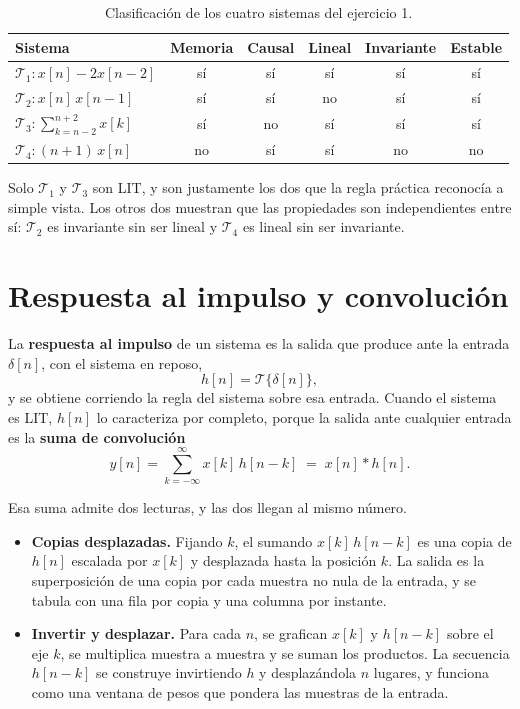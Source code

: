 \documentclass[10pt,a4paper]{article}
\newcommand{\tema}[1]{%
  \bigskip
  \section*{#1}
  \vspace{-0.6em}
}
\begin{document}
	\begin{table}[H]
		\centering
		\caption{Clasificación de los cuatro sistemas del ejercicio 1.}
		\label{tab:sol_ej1}
		\begin{tabular}{lccccc}
			\toprule
			Sistema & Memoria & Causal & Lineal & Invariante & Estable \\
			\midrule
			$\mathcal{T}_1: x[n]-2x[n-2]$          & sí & sí & sí & sí & sí \\
			$\mathcal{T}_2: x[n]\,x[n-1]$          & sí & sí & no & sí & sí \\
			$\mathcal{T}_3: \sum_{k=n-2}^{n+2}x[k]$ & sí & no & sí & sí & sí \\
			$\mathcal{T}_4: (n+1)\,x[n]$            & no & sí & sí & no & no \\
			\bottomrule
		\end{tabular}
	\end{table}

	Solo $\mathcal{T}_1$ y $\mathcal{T}_3$ son LIT, y son justamente los dos que la
	regla práctica reconocía a simple vista. Los otros dos muestran que las propiedades son
	independientes entre sí: $\mathcal{T}_2$ es invariante sin ser lineal y $\mathcal{T}_4$
	es lineal sin ser invariante.

	\tema{Respuesta al impulso y convolución}

	La \textbf{respuesta al impulso} de un sistema es la salida que produce ante la entrada
	$\delta[n]$, con el sistema en reposo,
	\[
		h[n] = \mathcal{T}\{\delta[n]\},
	\]
	y se obtiene corriendo la regla del sistema sobre esa entrada. Cuando el sistema es
	LIT, $h[n]$ lo caracteriza por completo, porque la salida ante cualquier entrada es la
	\textbf{suma de convolución}
	\[
		y[n] = \sum_{k=-\infty}^{\infty} x[k]\,h[n-k] \;=\; x[n]*h[n].
	\]

	Esa suma admite dos lecturas, y las dos llegan al mismo número.

	\begin{itemize}[nosep]
		\item \textbf{Copias desplazadas.} Fijando $k$, el sumando $x[k]\,h[n-k]$ es una
		      copia de $h[n]$ escalada por $x[k]$ y desplazada hasta la posición $k$. La
		      salida es la superposición de una copia por cada muestra no nula de la
		      entrada, y se tabula con una fila por copia y una columna por instante.
		\item \textbf{Invertir y desplazar.} Para cada $n$, se grafican $x[k]$ y $h[n-k]$
		      sobre el eje $k$, se multiplica muestra a muestra y se suman los productos.
		      La secuencia $h[n-k]$ se construye invirtiendo $h$ y desplazándola $n$
		      lugares, y funciona como una ventana de pesos que pondera las muestras de la entrada.
	\end{itemize}
\end{document}
